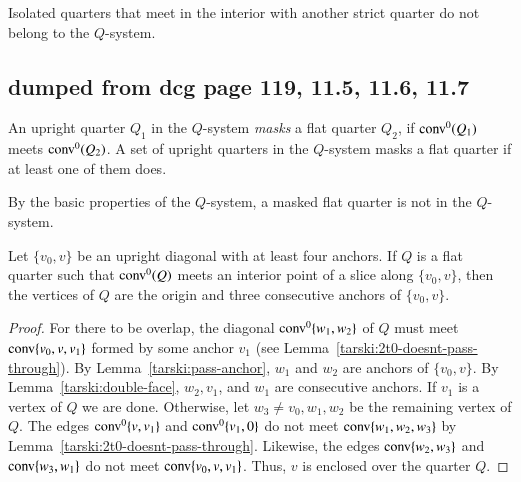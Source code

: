 \begin{tarskidata}
\begin{tarski}
Isolated quarters that meet in the interior with another strict
quarter do not belong to the $Q$-system.
\end{tarski}








\begin{tarski}
\subsection{dumped from dcg page 119, 11.5, 11.6, 11.7}
\begin{definition}[mask]
An upright quarter $Q_1$ in the $Q$-system
{\it masks} a flat quarter $Q_2$, if
${\operatorname{conv}}^0(Q_1)$ meets ${\operatorname{conv}}^0(Q_2)$.   A set of upright
quarters in the $Q$-system masks a flat quarter if at least 
one of them does.
\end{definition}

By the basic properties of the $Q$-system, a masked flat quarter is
not in the $Q$-system.
\end{tarski}


\begin{tarski}

\begin{lemma}
Let $\{v_0,v\}$ be an upright diagonal with at least four anchors.
If $Q$ is a flat quarter such that ${\operatorname{conv}}^0(Q)$  meets  
an interior point of 
a slice along $\{v_0,v\}$, then the vertices of $Q$ are the
origin and three consecutive anchors of $\{v_0,v\}$.
\end{lemma}

\begin{proof}
For there to be overlap, the diagonal ${\operatorname{conv}}^0\{w_1,w_2\}$ of $Q$ 
must meet
 ${\operatorname{conv}}\{v_0,v,v_1\}$ formed by some anchor $v_1$  (see
Lemma~\ref{tarski:2t0-doesnt-pass-through}).  By
Lemma~\ref{tarski:pass-anchor}, $w_1$ and $w_2$ are anchors of
$\{v_0,v\}$. By Lemma~\ref{tarski:double-face}, $w_2,v_1$, and $w_1$
are consecutive anchors. If $v_1$ is a vertex of $Q$ we are done.
Otherwise, let $w_3\ne v_0,w_1,w_2$ be the remaining vertex of $Q$.
The edges ${\operatorname{conv}}^0\{v,v_1\}$ and ${\operatorname{conv}}^0\{v_1,0\}$ do not
meet
${\operatorname{conv}}\{w_1,w_2,w_3\}$ by Lemma~\ref{tarski:2t0-doesnt-pass-through}.
Likewise, the edges ${\operatorname{conv}}\{w_2,w_3\}$ and ${\operatorname{conv}}\{w_3,w_1\}$ 
do not meet
 ${\operatorname{conv}}\{v_0,v,v_1\}$. Thus, $v$ is enclosed over the
quarter $Q$.


\end{proof}
\end{tarski}
\end{tarskidata}
